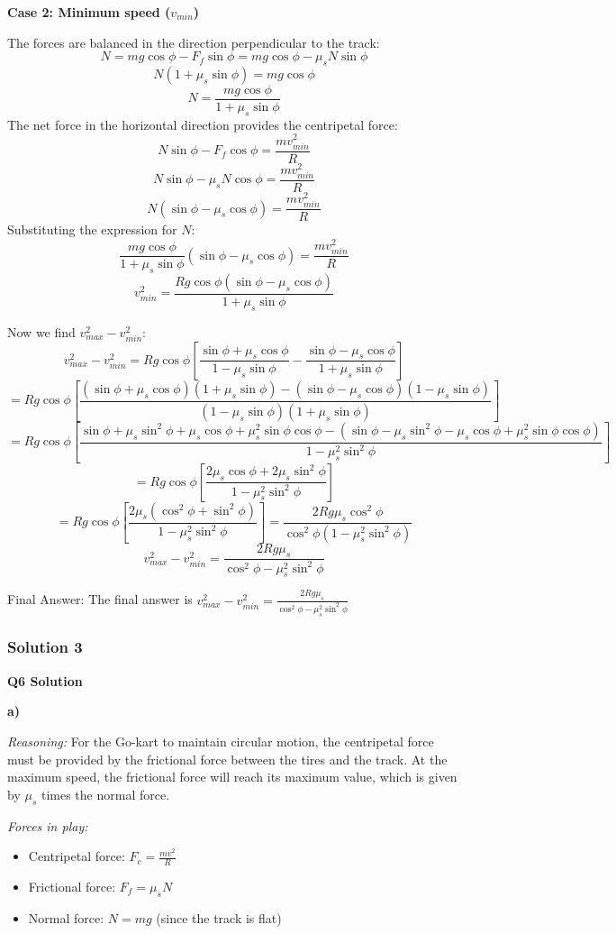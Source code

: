 \documentclass{article}
\begin{document}
\textbf{Case 2: Minimum speed ($v_{min}$)}

The forces are balanced in the direction perpendicular to the track:
$$N = mg\cos\phi - F_f\sin\phi = mg\cos\phi - \mu_s N\sin\phi$$
$$N(1+\mu_s\sin\phi) = mg\cos\phi$$
$$N = \frac{mg\cos\phi}{1+\mu_s\sin\phi}$$
The net force in the horizontal direction provides the centripetal force:
$$N\sin\phi - F_f\cos\phi = \frac{mv_{min}^2}{R}$$
$$N\sin\phi - \mu_s N\cos\phi = \frac{mv_{min}^2}{R}$$
$$N(\sin\phi - \mu_s\cos\phi) = \frac{mv_{min}^2}{R}$$
Substituting the expression for $N$:
$$\frac{mg\cos\phi}{1+\mu_s\sin\phi}(\sin\phi - \mu_s\cos\phi) = \frac{mv_{min}^2}{R}$$
$$v_{min}^2 = \frac{Rg\cos\phi(\sin\phi - \mu_s\cos\phi)}{1+\mu_s\sin\phi}$$

Now we find $v_{max}^2 - v_{min}^2$:
$$v_{max}^2 - v_{min}^2 = Rg\cos\phi\left[\frac{\sin\phi + \mu_s\cos\phi}{1-\mu_s\sin\phi} - \frac{\sin\phi - \mu_s\cos\phi}{1+\mu_s\sin\phi}\right]$$
$$= Rg\cos\phi\left[\frac{(\sin\phi + \mu_s\cos\phi)(1+\mu_s\sin\phi) - (\sin\phi - \mu_s\cos\phi)(1-\mu_s\sin\phi)}{(1-\mu_s\sin\phi)(1+\mu_s\sin\phi)}\right]$$
$$= Rg\cos\phi\left[\frac{\sin\phi + \mu_s\sin^2\phi + \mu_s\cos\phi + \mu_s^2\sin\phi\cos\phi - (\sin\phi - \mu_s\sin^2\phi - \mu_s\cos\phi + \mu_s^2\sin\phi\cos\phi)}{1-\mu_s^2\sin^2\phi}\right]$$
$$= Rg\cos\phi\left[\frac{2\mu_s\cos\phi + 2\mu_s\sin^2\phi}{1-\mu_s^2\sin^2\phi}\right]$$
$$= Rg\cos\phi\left[\frac{2\mu_s(\cos^2\phi + \sin^2\phi)}{1-\mu_s^2\sin^2\phi}\right] = \frac{2Rg\mu_s\cos^2\phi}{\cos^2\phi(1-\mu_s^2\sin^2\phi)}$$
$$v_{max}^2 - v_{min}^2 = \frac{2Rg\mu_s}{\cos^2\phi - \mu_s^2\sin^2\phi}$$

Final Answer: The final answer is $\boxed{v_{max}^2 - v_{min}^2 = \frac{2Rg\mu_s}{\cos^2\phi - \mu_s^2\sin^2\phi}}$

\subsubsection{Solution 3}
\textbf{Q6 Solution}

\textbf{a)}

\textit{Reasoning:} For the Go-kart to maintain circular motion, the centripetal force must be provided by the frictional force between the tires and the track. At the maximum speed, the frictional force will reach its maximum value, which is given by $\mu_s$ times the normal force.

\textit{Forces in play:}
\begin{itemize}
    \item Centripetal force: $F_c = \frac{mv^2}{R}$
    \item Frictional force: $F_f = \mu_s N$
    \item Normal force: $N = mg$ (since the track is flat)
\end{itemize}
\end{document}

